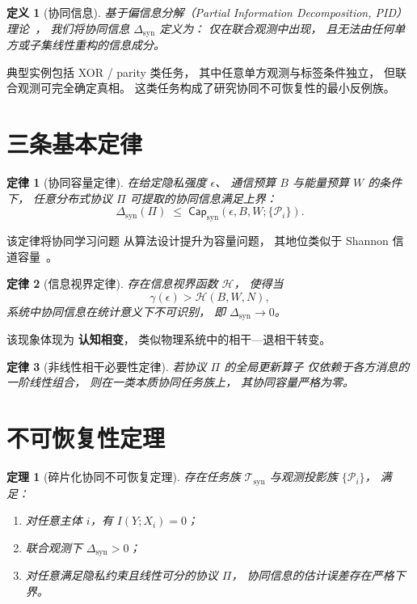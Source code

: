 \documentclass[11pt,a4paper]{article}
\newtheorem{law}{定律}
\newtheorem{theorem}{定理}
\newtheorem{definition}{定义}
\newcommand{\syn}{\Delta_{\mathrm{syn}}}
\newcommand{\proj}{\mathcal{P}}
\newcommand{\protocol}{\Pi}
\begin{document}
\begin{definition}[协同信息]
基于偏信息分解（Partial Information Decomposition, PID）理论~\cite{williams2010nonnegative}，
我们将协同信息 $\syn$ 定义为：
仅在联合观测中出现，
且无法由任何单方或子集线性重构的信息成分。
\end{definition}

典型实例包括 XOR / parity 类任务，
其中任意单方观测与标签条件独立，
但联合观测可完全确定真相。
这类任务构成了研究协同不可恢复性的最小反例族。

\section{三条基本定律}

\begin{law}[协同容量定律]
在给定隐私强度 $\epsilon$、
通信预算 $B$ 与能量预算 $W$ 的条件下，
任意分布式协议 $\protocol$
可提取的协同信息满足上界：
\[
\syn(\protocol)
\;\le\;
\mathsf{Cap}_{\mathrm{syn}}(\epsilon,B,W;\{\proj_i\}).
\]
\end{law}

该定律将协同学习问题
从算法设计提升为容量问题，
其地位类似于 Shannon 信道容量~\cite{shannon1948}。

\begin{law}[信息视界定律]
存在信息视界函数 $\mathcal{H}$，
使得当
\[
\gamma(\epsilon) > \mathcal{H}(B,W,N),
\]
系统中协同信息在统计意义下不可识别，
即 $\syn \rightarrow 0$。
\end{law}

该现象体现为
\textbf{认知相变}，
类似物理系统中的相干—退相干转变。

\begin{law}[非线性相干必要性定律]
若协议 $\protocol$ 的全局更新算子
仅依赖于各方消息的一阶线性组合，
则在一类本质协同任务族上，
其协同容量严格为零。
\end{law}

\section{不可恢复性定理}

\begin{theorem}[碎片化协同不可恢复定理]
存在任务族 $\mathcal{T}_{\mathrm{syn}}$
与观测投影族 $\{\proj_i\}$，
满足：
\begin{enumerate}[leftmargin=1.6em]
\item 对任意主体 $i$，有 $I(Y;X_i)=0$；
\item 联合观测下 $\syn>0$；
\item 对任意满足隐私约束且线性可分的协议 $\protocol$，
协同信息的估计误差存在严格下界。
\end{enumerate}
\end{theorem}
\end{document}
